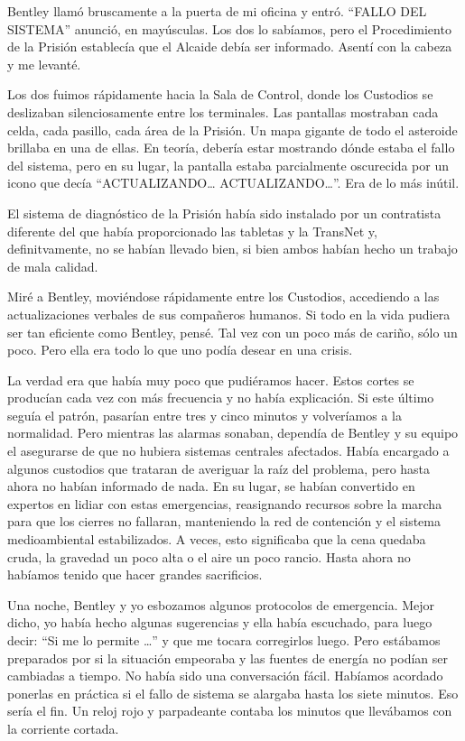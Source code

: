 Bentley llamó bruscamente a la puerta de mi oficina y entró. ``FALLO DEL
SISTEMA'' anunció, en mayúsculas. Los dos lo sabíamos, pero el
Procedimiento de la Prisión establecía que el Alcaide debía ser
informado. Asentí con la cabeza y me levanté.

Los dos fuimos rápidamente hacia la Sala de Control, donde los Custodios
se deslizaban silenciosamente entre los terminales. Las pantallas
mostraban cada celda, cada pasillo, cada área de la Prisión. Un mapa
gigante de todo el asteroide brillaba en una de ellas. En teoría,
debería estar mostrando dónde estaba el fallo del sistema, pero en su
lugar, la pantalla estaba parcialmente oscurecida por un icono que decía
``ACTUALIZANDO\ldots{} ACTUALIZANDO\ldots{}''. Era de lo más inútil.

El sistema de diagnóstico de la Prisión había sido instalado por un
contratista diferente del que había proporcionado las tabletas y la
TransNet y, definitvamente, no se habían llevado bien, si bien ambos
habían hecho un trabajo de mala calidad.

Miré a Bentley, moviéndose rápidamente entre los Custodios, accediendo a
las actualizaciones verbales de sus compañeros humanos. Si todo en la
vida pudiera ser tan eficiente como Bentley, pensé. Tal vez con un poco
más de cariño, sólo un poco. Pero ella era todo lo que uno podía desear
en una crisis.

La verdad era que había muy poco que pudiéramos hacer. Estos cortes se
producían cada vez con más frecuencia y no había explicación. Si este
último seguía el patrón, pasarían entre tres y cinco minutos y
volveríamos a la normalidad. Pero mientras las alarmas sonaban, dependía
de Bentley y su equipo el asegurarse de que no hubiera sistemas
centrales afectados. Había encargado a algunos custodios que trataran de
averiguar la raíz del problema, pero hasta ahora no habían informado de
nada. En su lugar, se habían convertido en expertos en lidiar con estas
emergencias, reasignando recursos sobre la marcha para que los cierres
no fallaran, manteniendo la red de contención y el sistema
medioambiental estabilizados. A veces, esto significaba que la cena
quedaba cruda, la gravedad un poco alta o el aire un poco rancio. Hasta
ahora no habíamos tenido que hacer grandes sacrificios.

Una noche, Bentley y yo esbozamos algunos protocolos de emergencia.
Mejor dicho, yo había hecho algunas sugerencias y ella había escuchado,
para luego decir: ``Si me lo permite \ldots{}'' y que me tocara
corregirlos luego. Pero estábamos preparados por si la situación
empeoraba y las fuentes de energía no podían ser cambiadas a tiempo. No
había sido una conversación fácil. Habíamos acordado ponerlas en
práctica si el fallo de sistema se alargaba hasta los siete minutos. Eso
sería el fin. Un reloj rojo y parpadeante contaba los minutos que
llevábamos con la corriente cortada.

